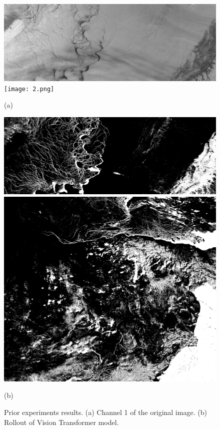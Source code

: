 \documentclass{article}
\begin{document}
        \begin{figure}[h]
            \centering
            \begin{minipage}{0.49\hsize}
                \centering
                \includegraphics[width = 1\hsize]{1.png}
                \texttt{[image: 2.png]}
                \caption*{(a)}
            \end{minipage}
            \begin{minipage}{0.49\hsize}
                \centering
                \includegraphics[width = 1\hsize]{1_vit.png}
                \includegraphics[width = 1\hsize]{2_vit.png}
                \caption*{(b)}
            \end{minipage}
            \caption{
                Prior experiments results.
                (a) Channel 1 of the original image.
                (b) Rollout of Vision Transformer model.
            }
            \label{fig:vit}
        \end{figure}
\end{document}

